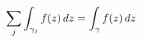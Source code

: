 \documentclass[preview]{standalone}
\begin{document}
\begin{align*}
\special{dvisvgm:raw <g id='unique000'>}\sum_j\int_{\gamma_j} f(z) \, dz = \int_\gamma f(z) \, dz\special{dvisvgm:raw </g>}
\end{align*}
\end{document}
